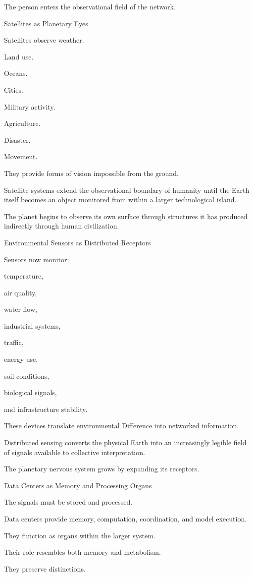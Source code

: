 The person enters the observational field of the network.

Satellites as Planetary Eyes

Satellites observe weather.

Land use.

Oceans.

Cities.

Military activity.

Agriculture.

Disaster.

Movement.

They provide forms of vision impossible from the ground.

Satellite systems extend the observational boundary of humanity until the Earth itself becomes an object monitored from within a larger technological island.

The planet begins to observe its own surface through structures it has produced indirectly through human civilization.

Environmental Sensors as Distributed Receptors

Sensors now monitor:

temperature,

air quality,

water flow,

industrial systems,

traffic,

energy use,

soil conditions,

biological signals,

and infrastructure stability.

These devices translate environmental Difference into networked information.

Distributed sensing converts the physical Earth into an increasingly legible field of signals available to collective interpretation.

The planetary nervous system grows by expanding its receptors.

Data Centers as Memory and Processing Organs

The signals must be stored and processed.

Data centers provide memory, computation, coordination, and model execution.

They function as organs within the larger system.

Their role resembles both memory and metabolism.

They preserve distinctions.

